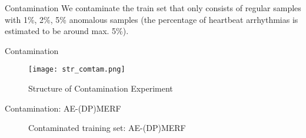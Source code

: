 \begin{frame}{Contamination}
    We \alert{contaminate} the train set that only consists of regular samples with \alert{1\%, 2\%, 5\% anomalous samples} (the percentage of heartbeat arrhythmias is estimated to be around max. 5\%).
\end{frame}

\begin{frame}{Contamination}

    \begin{figure}[h]
        \centering
        \texttt{[image: str\_comtam.png]}
        \caption{Structure of Contamination Experiment}
        \label{fig:enter-label}
    \end{figure}

\end{frame}

\begin{frame}{Contamination: AE-(DP)MERF}
    \begin{figure}

        \centering

        \caption{Contaminated training set: AE-(DP)MERF}

    \end{figure}
\end{frame}

